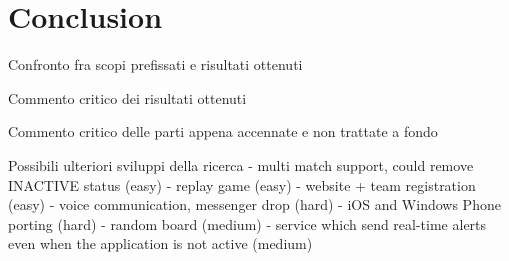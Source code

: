 \chapter{Conclusion}

	Confronto fra scopi prefissati e risultati ottenuti
	
	Commento critico dei risultati ottenuti
	
	Commento critico delle parti appena accennate e non trattate a fondo
	
	Possibili ulteriori sviluppi della ricerca
	- multi match support, could remove INACTIVE status (easy)
	- replay game (easy)
	- website +  team registration (easy)
	- voice communication, messenger drop (hard)
	- iOS and Windows Phone porting (hard)
	- random board (medium)
	- service which send real-time alerts even when the application is not active (medium)